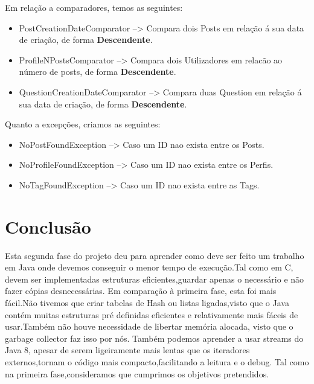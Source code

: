  Em relação a comparadores, temos as seguintes:
 \begin{itemize}
     \item PostCreationDateComparator --> Compara dois Posts em relação á sua data de criação, de forma \textbf{Descendente}.
     \item ProfileNPostsComparator --> Compara dois Utilizadores em relacão ao número de posts, de forma \textbf{Descendente}.

    \item QuestionCreationDateComparator --> Compara duas Question em relação á sua data de criação, de forma \textbf{Descendente}.
 \end{itemize}


 Quanto a excepções, criamos as seguintes:
 \begin{itemize}
     \item NoPostFoundException --> Caso um ID nao exista entre os Posts.
     \item NoProfileFoundException --> Caso um ID nao exista entre os Perfis.
     \item NoTagFoundException --> Caso um ID nao exista entre as Tags.
 \end{itemize}

\section{Conclusão}

Esta segunda fase do projeto deu para aprender como deve ser feito um trabalho em Java onde devemos conseguir o menor tempo de execução.Tal como em C, devem ser implementadas estruturas eficientes,guardar apenas o necessário e não fazer cópias desnecessárias.
\newline
Em comparação à primeira fase, esta foi mais fácil.Não tivemos que criar tabelas de Hash ou listas ligadas,visto que o Java contém muitas estruturas pré definidas eficientes e relativamente mais fáceis de usar.Também não houve necessidade de libertar memória alocada, visto que o garbage collector faz isso por nós.
\newline
Também podemos aprender a usar streams do Java 8, apesar de serem ligeiramente mais lentas que os iteradores externos,tornam o código mais compacto,facilitando a leitura e o debug.
\newline
Tal como na primeira fase,consideramos que cumprimos os objetivos pretendidos.



\addtolength{\textheight}{-12cm}   %

